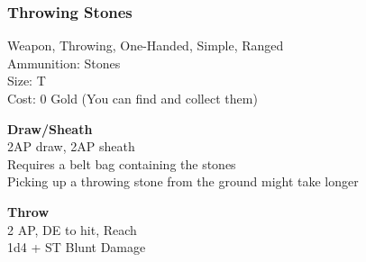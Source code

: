 \subsubsection{Throwing Stones}\label{weapon:throwingStones}
Weapon, Throwing, One-Handed, Simple, Ranged\\
Ammunition: Stones\\
Size: T\\
Cost: 0 Gold (You can find and collect them)

\textbf{Draw/Sheath}\\
2AP draw, 2AP sheath\\
Requires a belt bag containing the stones\\
Picking up a throwing stone from the ground might take longer

\textbf{Throw}\\
2 AP, DE to hit,  Reach\\
1d4 + \texttimes ST Blunt Damage

